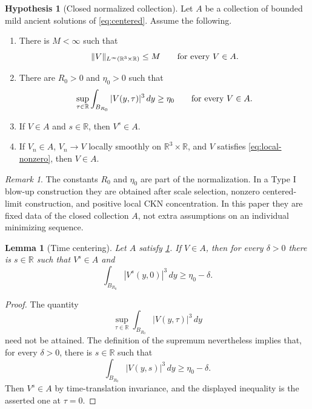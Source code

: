 \documentclass[11pt]{amsart}
\theoremstyle{plain}
\newtheorem{lemma}[theorem]{Lemma}
\theoremstyle{definition}
\newtheorem{hypothesis}[theorem]{Hypothesis}
\theoremstyle{remark}
\newtheorem{remark}[theorem]{Remark}
\numberwithin{equation}{section}
\begin{document}
\begin{hypothesis}[Closed normalized collection]\label{hyp:closed-normalized}
Let \(A\) be a collection of bounded mild ancient solutions of
\eqref{eq:centered}.  Assume the following.

\begin{enumerate}
\item There is \(M<\infty\) such that
\[
   \|V\|_{L^\infty(\mathbb R^3\times\mathbb R)}\le M
   \qquad\hbox{for every }V\in A .
\]

\item There are \(R_0>0\) and \(\eta_0>0\) such that
\begin{equation}\label{eq:local-nonzero}
   \sup_{\tau\in\mathbb R}\int_{B_{R_0}}|V(y,\tau)|^3\,dy\ge\eta_0
   \qquad\hbox{for every }V\in A .
\end{equation}

\item If \(V\in A\) and \(s\in\mathbb R\), then \(V^s\in A\).

\item If \(V_n\in A\), \(V_n\to V\) locally smoothly on
\(\mathbb R^3\times\mathbb R\), and \(V\) satisfies \eqref{eq:local-nonzero},
then \(V\in A\).
\end{enumerate}
\end{hypothesis}

\begin{remark}
The constants \(R_0\) and \(\eta_0\) are part of the normalization.  In a
Type I blow-up construction they are obtained after scale selection, nonzero
centered-limit construction, and positive local CKN concentration.  In this
paper they are fixed data of the closed
collection \(A\), not extra assumptions on an individual minimizing sequence.
\end{remark}

\begin{lemma}[Time centering]\label{lem:time-centering}
Let \(A\) satisfy \cref{hyp:closed-normalized}.  If \(V\in A\), then for every
\(\delta>0\) there is \(s\in\mathbb R\) such that \(V^s\in A\) and
\[
   \int_{B_{R_0}}|V^s(y,0)|^3\,dy\ge\eta_0-\delta .
\]
\end{lemma}

\begin{proof}
The quantity
\[
   \sup_{\tau\in\mathbb R}\int_{B_{R_0}}|V(y,\tau)|^3\,dy
\]
need not be attained.  The definition of the supremum nevertheless implies
that, for every \(\delta>0\), there is \(s\in\mathbb R\) such that
\[
   \int_{B_{R_0}}|V(y,s)|^3\,dy\ge\eta_0-\delta .
\]
Then \(V^s\in A\) by time-translation invariance, and the displayed inequality
is the asserted one at \(\tau=0\).
\end{proof}
\end{document}
